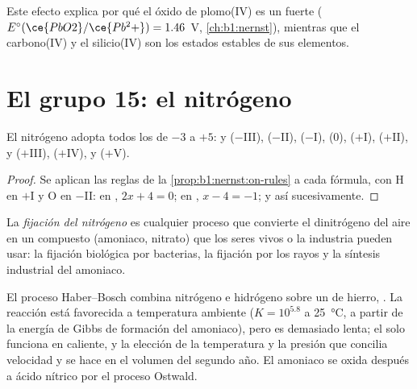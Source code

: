 Este efecto explica por qué el óxido de plomo(IV) es un  fuerte
($E^\circ(\ce{PbO2}/\ce{Pb^2+}) = 1.46$~V, \cref{ch:b1:nernst}), mientras
que el carbono(IV) y el silicio(IV) son los estados estables de sus
elementos.

\section{El grupo 15: el nitrógeno}

\begin{proposition}\label{prop:b1:p-block-13-15:nitrogen-ladder}
El nitrógeno adopta todos los  de $-3$ a $+5$:
 y  ($-$III),  ($-$II),  ($-$I),
 (0),  ($+$I),  ($+$II),  y 
($+$III),  ($+$IV),  y  ($+$V).
\end{proposition}

\begin{proof}
Se aplican las reglas de la \cref{prop:b1:nernst:on-rules} a cada
fórmula, con H en $+$I y O en $-$II: en , $2x + 4 = 0$; en
, $x - 4 =
-1$; y así sucesivamente.
\end{proof}

\begin{definition}\label{def:b1:p-block-13-15:nitrogen-fixation}
La \emph{fijación del nitrógeno} es cualquier proceso
que convierte el dinitrógeno del aire en un compuesto (amoniaco, nitrato)
que los seres vivos o la industria pueden usar: la fijación biológica
por bacterias, la fijación por los rayos y la síntesis industrial del
amoniaco.
\end{definition}

El proceso Haber--Bosch combina nitrógeno e hidrógeno sobre un
 de hierro, . La reacción está
favorecida a temperatura ambiente ($K = 10^{5.8}$ a \qty{25}{\celsius},
a partir de la energía de Gibbs de formación del amoniaco), pero es
demasiado lenta; el  solo funciona en caliente, y la elección
de la temperatura y la presión que concilia velocidad y  se
hace en el volumen del segundo año. El amoniaco se oxida después a ácido
nítrico por el proceso Ostwald.

